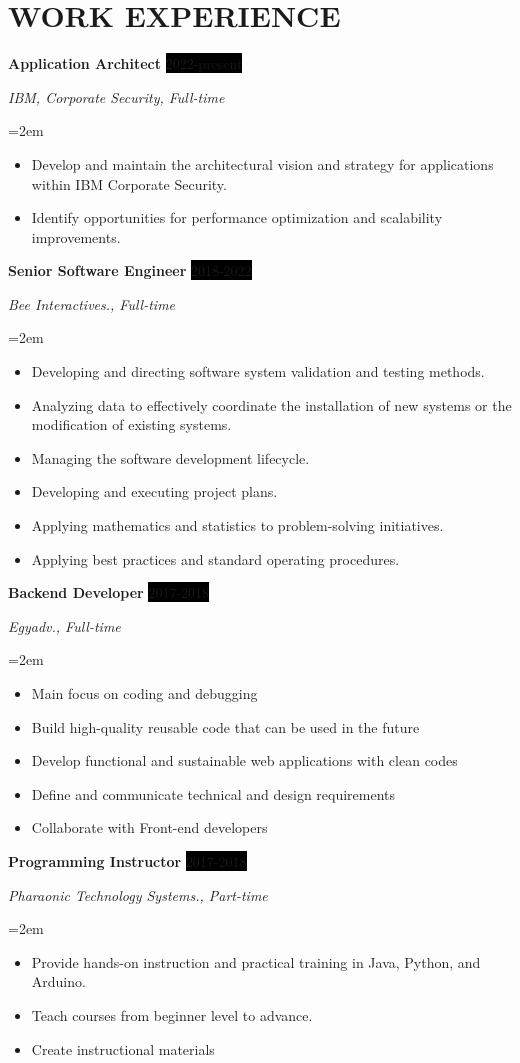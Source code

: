 \documentclass[paper=a4,fontsize=11pt]{scrartcl} %
\newcommand{\sepspace}{\vspace*{1em}}		%
\newcommand{\NewPart}[1]{\section*{\uppercase{#1}}}
\newcommand{\EducationEntry}[4]{
		\noindent \textbf{#1} \hfill      %
		\colorbox{Black}{%
			\parbox{6em}{%
			\hfill\color{White}#2}} \par  %
		\noindent \textit{#3} \par        %
		\noindent\hangindent=2em\hangafter=0 \small #4 %
		\normalsize \par}
\newcommand{\WorkEntry}[4]{				  %
		\noindent \textbf{#1} \hfill      %
		\colorbox{Black}{\color{White}#2} \par  %
		\noindent \textit{#3} \par              %
		\noindent\hangindent=2em\hangafter=0 \small #4 %
		\normalsize \par
		\sepspace}
\begin{document}
\NewPart{Work experience}{

\WorkEntry{Application Architect}{2022-present}{IBM, Corporate Security, Full-time}{
\begin{itemize}
\item Develop and maintain the architectural vision and strategy for applications within IBM Corporate Security.
\item Identify opportunities for performance optimization and scalability improvements.

\end{itemize}
}




\WorkEntry{Senior Software Engineer}{2018-2022}{Bee Interactives., Full-time}{
\begin{itemize}
\item Developing and directing software system validation and testing methods.
\item Analyzing data to effectively coordinate the installation of new systems or the modification of existing systems.
\item Managing the software development lifecycle.
\item Developing and executing project plans.
\item Applying mathematics and statistics to problem-solving initiatives.
\item Applying best practices and standard operating procedures.
\end{itemize}
}


\WorkEntry{Backend Developer}{2017-2018}{Egyadv., Full-time}{
\begin{itemize}
\item Main focus on coding and debugging
\item Build high-quality reusable code that can be used in the future
\item Develop functional and sustainable web applications with clean codes
\item Define and communicate technical and design requirements
\item Collaborate with Front-end developers 
\end{itemize}
}


\WorkEntry{Programming Instructor}{2017-2018}{Pharaonic Technology Systems., Part-time}{
\begin{itemize}
\item Provide hands-on instruction and practical training in Java, Python, and Arduino.
\item Teach courses from beginner level to advance.
\item Create instructional materials
\end{itemize}
}

}
\end{document}
